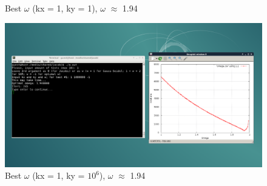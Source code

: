 \documentclass[a4paper, fleqn]{report}
\begin{document}
\begin{figure}[h]
\begin{minipage}{0.49\textwidth}
        \caption{Best \(\omega\) (kx = 1, ky = 1), \(\omega\) \(\approx\) 1.94}
        \label{fig:best_w_1_1}
    \end{minipage}%
    \begin{minipage}{0.49\textwidth}
        \centering
        \includegraphics[width=\textwidth]{media/best_w_1_1000000.png}
        \caption{Best \(\omega\) (kx = 1, ky = $10^6$), \(\omega\) \(\approx\) 1.94}
        \label{fig:best_w_1_1000000}
    \end{minipage}
\end{figure}
\end{document}
